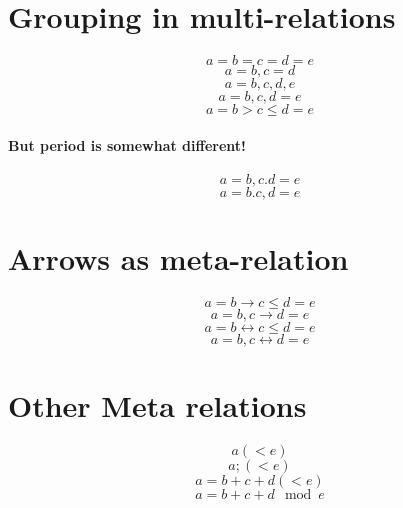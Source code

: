 \documentclass{article}
\begin{document}
\section{Grouping in multi-relations}
\[ a=b=c=d=e \]
\[ a=b,c=d   \]
\[ a=b,c,d,e \]
\[ a=b,c,d=e \]
\[ a=b>c\le d=e \]

\paragraph{But period is somewhat different!}
\[ a=b,c.d=e \]
\[ a=b.c,d=e \]


\section{Arrows as meta-relation}
\[ a=b \rightarrow c\le d=e \]
\[ a=b,c \rightarrow d=e \]
\[ a=b \leftrightarrow c\le d=e \]
\[ a=b,c \leftrightarrow d=e \]

\section{Other Meta relations}
\[ a (< e) \]
\[ a; (< e) \]
\[ a = b + c + d (< e) \]
\[ a = b + c + d \mod e \]
 
\end{document}
